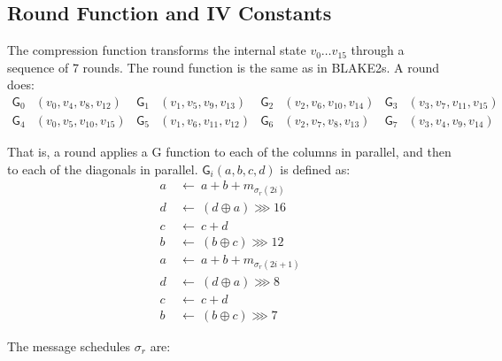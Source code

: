 \documentclass[11pt,notitlepage,a4paper]{article}
\newcommand{\GG}{\mathsf{G}}
\begin{document}
\nocite{*}



\begin{appendices}

\section{Round Function and IV Constants}\label{sec:roundfn}

The compression function transforms the internal state $v_{0} \ldots
v_{15}$ through a sequence of 7 rounds. The round function is the same as
in BLAKE2s. A round does:
\begin{align*}
    \GG_{0}&(v_{0}, v_{4}, v_{8}, v_{12}) &
    \GG_{1}&(v_{1}, v_{5}, v_{9}, v_{13}) &
    \GG_{2}&(v_{2}, v_{6}, v_{10}, v_{14}) &
    \GG_{3}&(v_{3}, v_{7}, v_{11}, v_{15}) \\
    \GG_{4}&(v_{0}, v_{5}, v_{10}, v_{15}) &
    \GG_{5}&(v_{1}, v_{6}, v_{11}, v_{12}) &
    \GG_{6}&(v_{2}, v_{7}, v_{8}, v_{13}) &
    \GG_{7}&(v_{3}, v_{4}, v_{9}, v_{14})
\end{align*}

That is, a round applies a G function to each of the columns in parallel,
and then to each of the diagonals in parallel. $\GG_i(a, b, c, d)$ is
defined as:
\begin{align*}
    a \ & \leftarrow \ a + b + m_{\sigma_r(2i)} \\
    d \ & \leftarrow \ (d \oplus a) \ggg 16 \\
    c \ & \leftarrow \ c + d \\
    b \ & \leftarrow \ (b \oplus c) \ggg 12 \\
    a \ & \leftarrow \ a + b + m_{\sigma_r(2i+1)} \\
    d \ & \leftarrow \ (d \oplus a) \ggg 8 \\
    c \ & \leftarrow \ c + d \\
    b \ & \leftarrow \ (b \oplus c) \ggg 7
\end{align*}

The message schedules $\sigma_r$ are:


\end{appendices}
\end{document}
